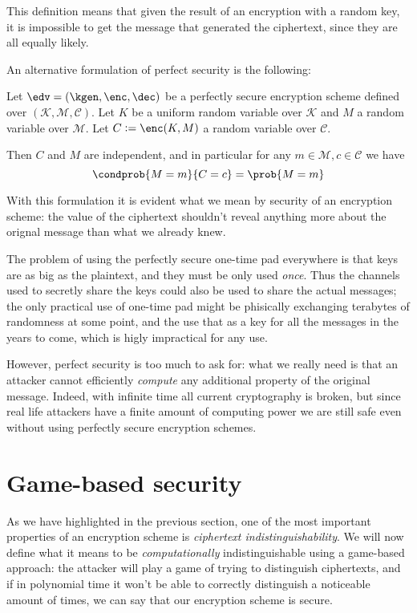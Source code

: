 This definition means that given the result of an encryption with a random key, it is impossible to get the message that generated the ciphertext, since they are all equally likely.

An alternative formulation of perfect security is the following:
\begin{proposition}
    Let $\edv=(\kgen,\enc,\dec)$ be a perfectly secure encryption scheme defined over $(\mathcal K, \mathcal M, \mathcal C)$. Let $K$ be a uniform random variable over $\mathcal K$ and $M$ a random variable over $\mathcal M$. Let $C:=\enc(K,M)$ a random variable over $\mathcal C$.
    
    Then $C$ and $M$ are independent, and in particular for any $m\in\mathcal M,c\in\mathcal C$ we have $$\condprob{M=m}{C=c} = \prob{M=m}$$
\end{proposition}

With this formulation it is evident what we mean by security of an encryption scheme: the value of the ciphertext shouldn't reveal anything more about the orignal message than what we already knew.

The problem of using the perfectly secure one-time pad everywhere is that keys are as big as the plaintext, and they must be only used \emph{once}. Thus the channels used to secretly share the keys could also be used to share the actual messages; the only practical use of one-time pad might be phisically exchanging terabytes of randomness at some point, and the use that as a key for all the messages in the years to come, which is higly impractical for any use.

However, perfect security is too much to ask for: what we really need is that an attacker cannot efficiently \emph{compute} any additional property of the original message. Indeed, with infinite time all current cryptography is broken, but since real life attackers have a finite amount of computing power we are still safe even without using perfectly secure encryption schemes.

\section{Game-based security}
As we have highlighted in the previous section, one of the most important properties of an encryption scheme is \emph{ciphertext indistinguishability}. We will now define what it means to be \emph{computationally} indistinguishable using a game-based approach: the attacker will play a game of trying to distinguish ciphertexts, and if in polynomial time it won't be able to correctly distinguish a noticeable amount of times, we can say that our encryption scheme is secure.

